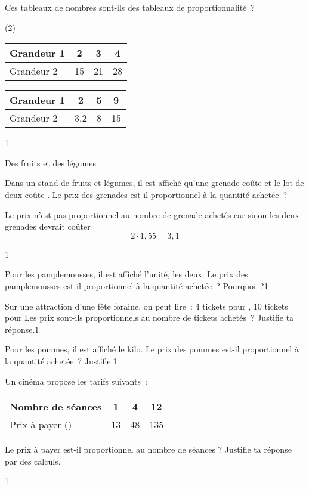 \documentclass[a4paper,11pt]{report}
\begin{document}
\begin{exo}{
Ces tableaux de nombres sont-ils des tableaux de proportionnalité~?
\begin{tasks}(2)
\task 
\begin{tabular}{|l|c|c|c|}\hline
Grandeur 1 & 2 & 3 & 4  \\\hline
Grandeur 2 & 15 & 21 & 28  \\\hline
\end{tabular}
\task 
\begin{tabular}{|l|c|c|c|}\hline
Grandeur 1 & 2 & 5 & 9  \\\hline
Grandeur 2 & 3,2 &8 & 15  \\\hline
\end{tabular}
\end{tasks}
\medskip}{1}
\end{exo}

\begin{resolu}
{Des fruits et des légumes}{Dans un stand de fruits et légumes, il est affiché qu'une grenade coûte   et le lot de deux coûte . Le prix des grenades est-il proportionnel à la quantité achetée~?

Le prix n'est pas proportionnel au nombre de grenade achetés car sinon les deux grenades devrait coûter   
\[2\cdot 1,55 = 3,1 \]
\vspace{-1cm}
}{1}
\end{resolu}



\begin{exo}{
	Pour les pamplemousses, il est affiché  l'unité,  les deux. Le prix des pamplemousses est-il proportionnel à la quantité achetée~? Pourquoi~?}{1}
\end{exo}

\begin{exo}{
	Sur une attraction d'une fête foraine, on peut lire~: 4 tickets pour , 10 tickets pour  Les prix sont-ils proportionnels au nombre de tickets achetés~? Justifie ta réponse.}{1}
\end{exo}

\begin{exo}{
	Pour les pommes, il est affiché  le kilo. Le prix des pommes est-il proportionnel à la quantité achetée~? Justifie.}{1}
\end{exo}


\begin{exo}{
Un cinéma propose les tarifs suivants~:
\begin{center}
\begin{tabular}{|l|c|c|c|}\hline
Nombre de séances & 1 & 4 & 12  \\\hline
Prix à payer (\tunit{}{\fr}) & 13 &48 & 135  \\\hline
\end{tabular}
\end{center}

Le prix à payer est-il proportionnel au nombre de séances ? Justifie ta réponse par des calculs.

}{1}
\end{exo}
\end{document}
